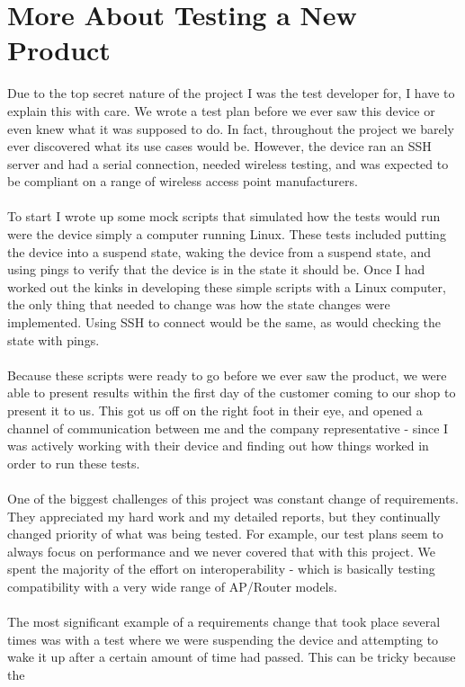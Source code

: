 \documentclass{article}
\begin{document}
\section*{More About Testing a New Product}
Due to the top secret nature of the project I was the test developer for, I have
to explain this with care. We wrote a test plan before we ever saw this device
or even knew what it was supposed to do. In fact, throughout the project we
barely ever discovered what its use cases would be. However, the device ran an
SSH server and had a serial connection, needed wireless testing, and was
expected to be compliant on a range of wireless access point manufacturers.\\
\\
To start I wrote up some mock scripts that simulated how the tests would
run were the device simply a computer running Linux. These tests included
putting the device into a suspend state, waking the device from a
suspend state, and using pings to verify that the device is in the state it
should be. Once I had worked out the kinks in developing these simple scripts
with a Linux computer, the only thing that needed to change was how the state
changes were implemented. Using SSH to connect would be the same, as would 
checking the state with pings.\\
\\
Because these scripts were ready to go before we ever saw the product, we were
able to present results within the first day of the customer coming to our shop
to present it to us. This got us off on the right foot in their eye, and opened
a channel of communication between me and the company representative - since I
was actively working with their device and finding out how things worked in
order to run these tests.\\
\\
One of the biggest challenges of this project was constant change of 
requirements. They appreciated my hard work and my detailed reports, but they
continually changed priority of what was being tested. For example, our test
plans seem to always focus on performance and we never covered that with this
project. We spent the majority of the effort on interoperability - which is
basically testing compatibility with a very wide range of AP/Router models.\\
\\
The most significant example of a requirements change that took place several
times was with a test where we were suspending the device and attempting to wake
it up after a certain amount of time had passed. This can be tricky because the
\end{document}
